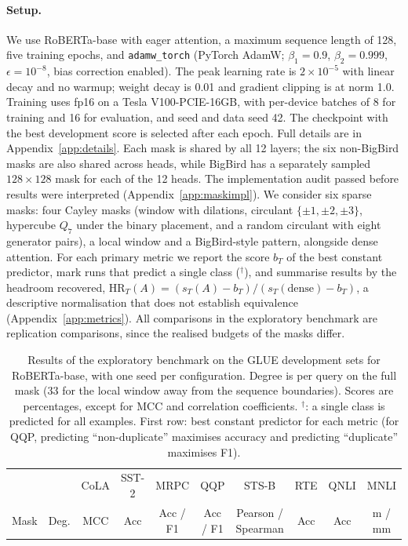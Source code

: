 \documentclass[10pt]{article}
\newcommand{\HR}{\mathrm{HR}}
\newcommand{\dg}{$^\dagger$}
\begin{document}
\paragraph{Setup.} We use RoBERTa-base with eager attention, a maximum sequence length of 128, five training epochs, and \texttt{adamw\_torch} (PyTorch AdamW; $\beta_1=0.9$, $\beta_2=0.999$, $\epsilon=10^{-8}$, bias correction enabled). The peak learning rate is $2\times10^{-5}$ with linear decay and no warmup; weight decay is 0.01 and gradient clipping is at norm 1.0. Training uses fp16 on a Tesla V100-PCIE-16GB, with per-device batches of 8 for training and 16 for evaluation, and seed and data seed 42. The checkpoint with the best development score is selected after each epoch. Full details are in Appendix~\ref{app:details}. Each mask is shared by all 12 layers; the six non-BigBird masks are also shared across heads, while BigBird has a separately sampled $128\times128$ mask for each of the 12 heads. The implementation audit passed before results were interpreted (Appendix~\ref{app:maskimpl}). We consider six sparse masks: four Cayley masks (window with dilations, circulant $\{\pm1,\pm2,\pm3\}$, hypercube $Q_7$ under the binary placement, and a random circulant with eight generator pairs), a local window and a BigBird-style pattern, alongside dense attention. For each primary metric we report the score $b_T$ of the best constant predictor, mark runs that predict a single class (\dg), and summarise results by the headroom recovered, $\HR_T(A)=(s_T(A)-b_T)/(s_T(\text{dense})-b_T)$, a descriptive normalisation that does not establish equivalence (Appendix~\ref{app:metrics}). All comparisons in the exploratory benchmark are replication comparisons, since the realised budgets of the masks differ.

\begin{table}[t]
\centering
\caption{Results of the exploratory benchmark on the GLUE development sets for RoBERTa-base, with one seed per configuration. Degree is per query on the full mask (33 for the local window away from the sequence boundaries). Scores are percentages, except for MCC and correlation coefficients. \dg: a single class is predicted for all examples. First row: best constant predictor for each metric (for QQP, predicting ``non-duplicate'' maximises accuracy and predicting ``duplicate'' maximises F1).}
\label{tab:main}
\setlength{\tabcolsep}{3.5pt}
\scriptsize
\begin{tabular}{lrcccccccc}
\toprule
 & & CoLA & SST-2 & MRPC & QQP & STS-B & RTE & QNLI & MNLI \\
Mask & Deg. & MCC & Acc & Acc / F1 & Acc / F1 & Pearson / Spearman & Acc & Acc & m / mm \\
\midrule

\end{tabular}
\end{table}
\end{document}
